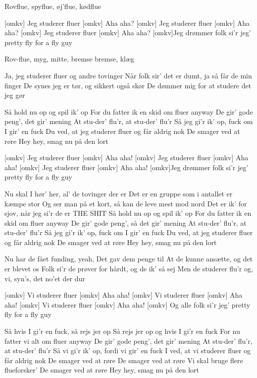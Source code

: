 \documentclass[a4paper,11pt]{article}
\begin{document}
\begin{song}
   Rovflue, spyflue,  øj’flue, kødflue

  [omkv] Jeg studerer fluer
 [omkv] Aha aha?
  [omkv] Jeg studerer fluer
 [omkv] Aha aha?
  [omkv] Jeg studerer fluer
 [omkv] Aha aha?
  [omkv]Jeg drømmer folk si’r jeg’ pretty fly for a fly guy

  Rov-flue, myg, mitte, bremse bremse, klæg

  Ja, jeg studerer fluer og andre tovinger
Når folk sir’ det er dumt, ja så får de min finger
De synes jeg er tør, og sikkert også skør
De dømmer mig for at studere det jeg gør

 Så hold nu op og spil ik’ op
For du fatter ik en skid om fluer anyway
De gir’ gode peng’, det gir’ mening
At stu-der’ flu’r, at stu-der’ flu’r
Så jeg gi’r ik’ op, fuck om I gir’ en fuck
Du ved, at jeg studerer
fluer og får aldrig nok
De smager ved at røre
Hey hey, smag nu på den lort

[omkv] Jeg studerer fluer
 [omkv] Aha aha!
  [omkv] Jeg studerer fluer
 [omkv] Aha aha!
  [omkv] Jeg studerer fluer
 [omkv] Aha aha!
  [omkv]Jeg drømmer folk si’r jeg’ pretty fly for a fly guy

 Nu skal I hør’ her, al’ de tovinger der er
Det er en gruppe som i antallet er kæmpe stor
Og ser man på et kort, så kan de leve mest mod nord
Det er ik’ for sjov, når jeg si’r de er THE SHIT
Så hold nu op og spil ik’ op
For du fatter ik en skid om fluer anyway
De gir’ gode peng’, så det gir’ mening
At stu-der’ flu’r, at stu-der’ flu’r
Så jeg gi’r ik’ op, fuck om I gir’ en fuck
Du ved, at jeg studerer
fluer og får aldrig nok
De smager ved at røre
Hey hey, smag nu på den lort

Nu har de fået funding, yeah, 
Det gav dem penge til
At de kunne ansætte, og det er blevet os
Folk si'r de prøver for hårdt, og de ik' så sej
Men de studerer flu’r og, vi, syn’s, det no’et der dur

[omkv] Vi studerer fluer
 [omkv] Aha aha!
  [omkv] Vi studerer fluer
 [omkv] Aha aha!
  [omkv] Vi studerer fluer
 [omkv] Aha aha!
  [omkv] Og alle folk si’r jeg’ pretty fly for a fly guy

 Så hvis I gi’r en fuck, så rejs jer op
Så rejs jer op og hvis I gi’r en fuck
For nu fatter vi alt om fluer anyway
De gir’ gode peng’, det gir’ mening
At stu-der’ flu’r, at stu-der’ flu’r
Så vi gi’r ik’ op, fordi vi gir’ en fuck
I ved, at vi studerer
fluer og får aldrig nok
De smager ved at røre
De smager ved at røre
Vi skal bruge flere flueforsker’
De smager ved at røre
Hey hey, smag nu på den lort

\end{song}
\end{document}
